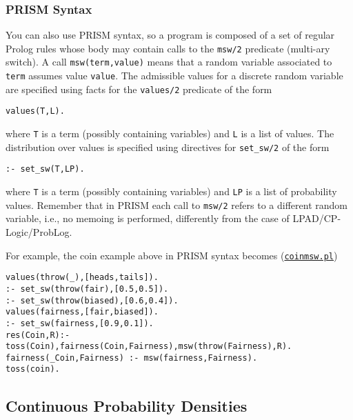 \subsubsection{PRISM Syntax}
You can also use PRISM \cite{DBLP:conf/ijcai/SatoK97} syntax, so a program is composed of
a set of regular Prolog rules whose body may contain calls to the \verb|msw/2| predicate (multi-ary 
switch). A call \verb|msw(term,value)| means that a random variable associated to \verb|term|
assumes value \verb|value|. The admissible values  for a discrete random variable are 
specified using facts for the \verb|values/2| predicate of the form
\begin{verbatim}
values(T,L).
\end{verbatim}
where \verb|T| is a term (possibly containing variables) and \verb|L| is a list of values.
The distribution over values is specified using directives for \verb|set_sw/2| of the form
\begin{verbatim}
:- set_sw(T,LP).
\end{verbatim}
where \verb|T| is a term (possibly containing variables) and \verb|LP| is a list of
probability values.
Remember that in PRISM each call to \verb|msw/2| refers to a different random
variable, i.e., no memoing is performed, differently from the case of LPAD/CP-Logic/ProbLog.

For example, the coin example above in PRISM syntax becomes
(\href{http://cplint.eu/example/inference/coinmsw.pl}{\texttt{coinmsw.pl}})
\begin{verbatim}
values(throw(_),[heads,tails]).
:- set_sw(throw(fair),[0.5,0.5]).
:- set_sw(throw(biased),[0.6,0.4]).
values(fairness,[fair,biased]).
:- set_sw(fairness,[0.9,0.1]).
res(Coin,R):- toss(Coin),fairness(Coin,Fairness),msw(throw(Fairness),R).
fairness(_Coin,Fairness) :- msw(fairness,Fairness).
toss(coin).
\end{verbatim}
\subsection{Continuous Probability Densities}
\label{cont}

